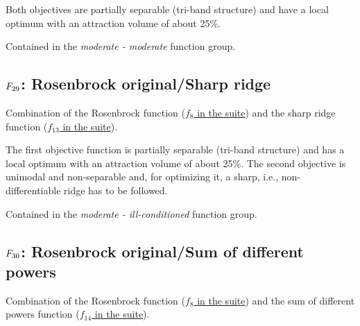 Both objectives are partially separable (tri-band structure) and have
a local optimum with an attraction volume of about 25\%.

Contained in the \emph{moderate - moderate} function group.



\subsection[\texorpdfstring{\protect\(F_{29}\protect\): Rosenbrock original/Sharp ridge}{F29: Rosenbrock original/Sharp ridge}]{\texorpdfstring{\protect\(F_{29}\protect\): Rosenbrock original/Sharp ridge}{}}
\label{index:rosenbrock-original-sharp-ridge}\label{index:f29}
Combination of the Rosenbrock function (\href{https://coco.gforge.inria.fr/downloads/download16.00/bbobdocfunctions.pdf\#page=40}{\(f_8\) in the \bbob suite}) and the
sharp ridge function (\href{https://coco.gforge.inria.fr/downloads/download16.00/bbobdocfunctions.pdf\#page=65}{\(f_{13}\) in the \bbob suite}).

The first objective function is partially separable (tri-band structure)
and has a local optimum with an attraction volume of about 25\%.
The second objective is unimodal and non-separable and, for
optimizing it, a sharp, i.e., non-differentiable ridge has to be followed.

Contained in the \emph{moderate - ill-conditioned} function group.



\subsection[\texorpdfstring{\protect\(F_{30}\protect\): Rosenbrock original/Sum of different powers}{F30: Rosenbrock original/Sum of different powers}]{\texorpdfstring{\protect\(F_{30}\protect\): Rosenbrock original/Sum of different powers}{}}
\label{index:f30}\label{index:rosenbrock-original-sum-of-different-powers}
Combination of the Rosenbrock function (\href{https://coco.gforge.inria.fr/downloads/download16.00/bbobdocfunctions.pdf\#page=40}{\(f_8\) in the \bbob suite}) and the sum of different powers function
(\href{https://coco.gforge.inria.fr/downloads/download16.00/bbobdocfunctions.pdf\#page=70}{\(f_{14}\) in the \bbob suite}).

